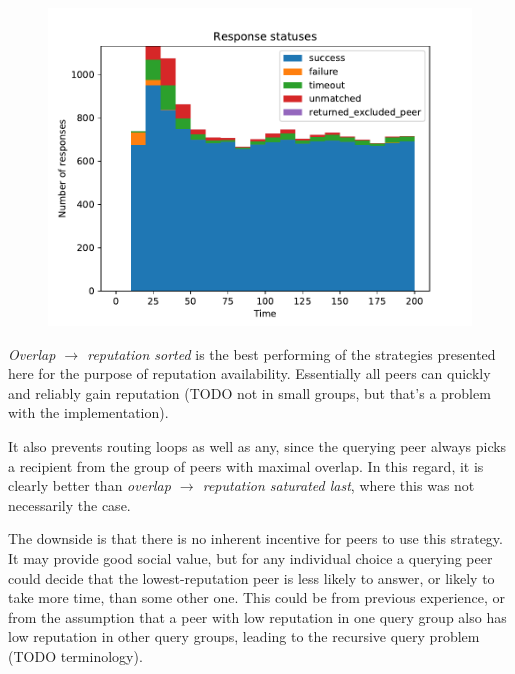 \begin{figure}[t]
\centering
\includegraphics[width=1\columnwidth]{figures/selection_overlap_rep_sorted_resp_statuses}
\label{fig:selection_overlap_rep_sorted_resp_statuses}
\end{figure}

\emph{Overlap $\rightarrow$ reputation sorted} is the best performing of the
strategies presented here for the purpose of reputation availability.
Essentially all peers can quickly and reliably gain reputation (TODO not in
small groups, but that's a problem with the implementation).

It also prevents routing loops as well as any, since the querying peer always
picks a recipient from the group of peers with maximal overlap. In this regard,
it is clearly better than \emph{overlap $\rightarrow$ reputation saturated
last}, where this was not necessarily the case.

The downside is that there is no inherent incentive for peers to use this
strategy. It may provide good social value, but for any individual choice a
querying peer could decide that the lowest-reputation peer is less likely to
answer, or likely to take more time, than some other one. This could be from
previous experience, or from the assumption that a peer with low reputation in
one query group also has low reputation in other query groups, leading to the
recursive query problem (TODO terminology).

